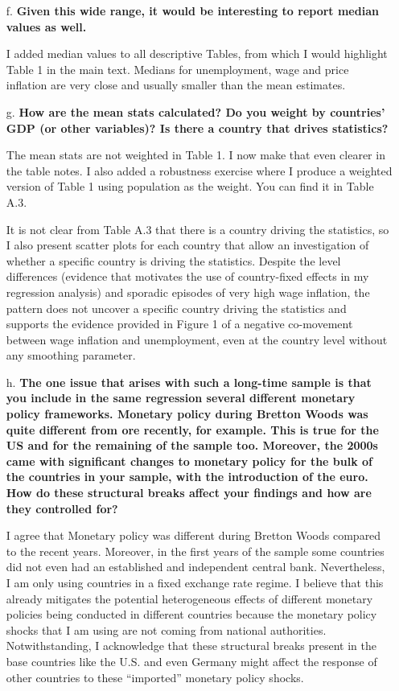 \documentclass[12pt]{article}
\begin{document}
\begin{enumerate}
\begin{itemize}
    \item[f.] \textbf{Given this wide range, it would be interesting to report median values as well.}


I added median values to all descriptive Tables, from which I would highlight Table 1 in the main text. Medians for unemployment, wage and price inflation are very close and usually smaller than the mean estimates.

    \item[g.] \textbf{How are the mean stats calculated? Do you weight by countries' GDP (or other variables)? Is there a country that drives statistics?}

The mean stats are not weighted in Table 1. I now make that even clearer in the table notes. I also added a robustness exercise where I produce a weighted version of Table 1 using population as the weight. You can find it in Table A.3.

It is not clear from Table A.3 that there is a country driving the statistics, so I also present scatter plots for each country that allow an investigation of whether a specific country is driving the statistics. Despite the level differences (evidence that motivates the use of country-fixed effects in my regression analysis) and sporadic episodes of very high wage inflation, the pattern does not uncover a specific country driving the statistics and supports the evidence provided in Figure 1 of a negative co-movement between wage inflation and unemployment, even at the country level without any smoothing parameter.



    \item[h.] \textbf{The one issue that arises with such a long-time sample is that you include in the same regression several different monetary policy frameworks. Monetary policy during Bretton Woods was quite different from ore recently, for example. This is true for the US and for the remaining of the sample too. Moreover, the 2000s came with significant changes to monetary policy for the bulk of the countries in your sample, with the introduction of the euro. How do these structural breaks affect your findings and how are they controlled for?}

I agree that Monetary policy was different during Bretton Woods compared to the recent years. Moreover, in the first years of the sample some countries did not even had an established and independent central bank. Nevertheless, I am only using countries in a fixed exchange rate regime. I believe that this already mitigates the potential heterogeneous effects of different monetary policies being conducted in different countries because the monetary policy shocks that I am using are not coming from national authorities. Notwithstanding, I acknowledge that these structural breaks present in the base countries like the U.S. and even Germany might affect the response of other countries to these “imported” monetary policy shocks.


\end{itemize}
\end{enumerate}
\end{document}

